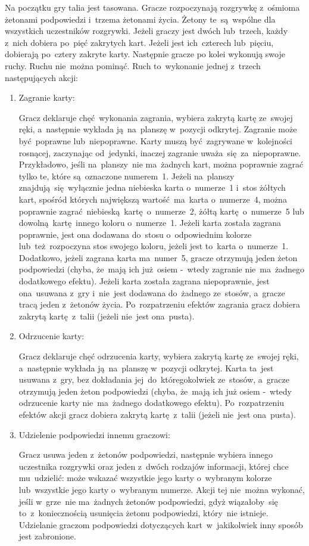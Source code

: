 \documentclass[declaration,shortabstract,inz]{iithesis}
\begin{document}
Na początku gry talia jest tasowana. Gracze rozpoczynają rozgrywkę z~ośmioma żetonami podpowiedzi i~trzema żetonami życia. Żetony te~są~wspólne dla wszystkich uczestników rozgrywki. Jeżeli graczy jest dwóch lub~trzech, każdy z~nich dobiera po~pięć zakrytych kart. Jeżeli jest ich~czterech lub~pięciu, dobierają po~cztery zakryte karty. Następnie gracze po kolei wykonują swoje ruchy. Ruchu nie~można pominąć. Ruch to~wykonanie jednej z~trzech następujących akcji:
\begin{enumerate}
	\item Zagranie karty:

	Gracz deklaruje chęć wykonania zagrania, wybiera zakrytą kartę ze~swojej ręki, a~następnie wykłada ją~na~planszę w~pozycji odkrytej. Zagranie może być~poprawne lub~niepoprawne. Karty muszą być~zagrywane w~kolejności rosnącej, zaczynając od~jedynki, inaczej zagranie uważa~się za~niepoprawne. Przykładowo, jeśli na~planszy~nie ma~żadnych kart, można poprawnie zagrać tylko te, które są~oznaczone numerem~1. Jeżeli na~planszy znajdują~się wyłącznie jedna niebieska karta o~numerze~1 i~stos żółtych kart, spośród których największą wartość ma~karta o~numerze~4, można poprawnie zagrać niebieską kartę o~numerze~2, żółtą kartę o~numerze~5 lub dowolną kartę innego koloru o~numerze~1. Jeżeli karta została zagrana poprawnie, jest ona dodawana do~stosu o~odpowiednim kolorze lub~też~rozpoczyna stos swojego koloru, jeżeli jest to~karta o~numerze~1. Dodatkowo, jeżeli zagrana karta ma~numer~5, gracze otrzymują jeden żeton podpowiedzi (chyba, że~mają ich już osiem -~wtedy zagranie nie~ma~żadnego dodatkowego efektu). Jeżeli karta została zagrana niepoprawnie, jest ona~usuwana z~gry i~nie~jest dodawana do~żadnego ze~stosów, a~gracze tracą jeden z~żetonów życia. Po~rozpatrzeniu efektów zagrania gracz dobiera zakrytą kartę z~talii (jeżeli nie~jest ona~pusta).
	
	\item Odrzucenie karty:
 
	Gracz deklaruje chęć odrzucenia karty, wybiera zakrytą kartę ze~swojej ręki, a~następnie wykłada ją~na~planszę w~pozycji odkrytej. Karta ta~jest usuwana z~gry, bez dokładania jej~do~któregokolwiek ze~stosów, a~gracze otrzymują jeden żeton podpowiedzi (chyba, że~mają ich już osiem -~wtedy odrzucenie karty nie~ma~żadnego dodatkowego efektu). Po~rozpatrzeniu efektów akcji gracz dobiera zakrytą kartę z~talii (jeżeli nie~jest ona~pusta).

	\item Udzielenie podpowiedzi innemu graczowi:

	Gracz usuwa jeden z~żetonów podpowiedzi, następnie wybiera innego uczestnika rozgrywki oraz jeden z~dwóch rodzajów informacji, której chce mu~udzielić: może wskazać wszystkie jego karty o~wybranym kolorze lub~wszystkie jego karty o~wybranym numerze. Akcji tej nie~można wykonać, jeśli w~grze~nie ma~żadnych żetonów podpowiedzi, gdyż wiązałoby~się to~z~koniecznością usunięcia żetonu podpowiedzi, który~nie istnieje. Udzielanie graczom podpowiedzi dotyczących kart w~jakikolwiek inny sposób jest zabronione.
\end{enumerate}
\end{document}
